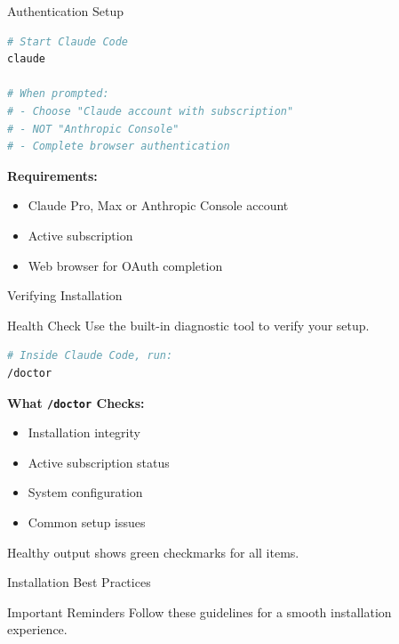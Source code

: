 \documentclass[9pt]{beamer}
\begin{document}
{\begin{frame}[fragile]{Authentication Setup}
\begin{lstlisting}[language=bash]
# Start Claude Code
claude

# When prompted:
# - Choose "Claude account with subscription"
# - NOT "Anthropic Console"
# - Complete browser authentication
\end{lstlisting}
		
		\textbf{Requirements:}
		\begin{itemize}
			\item Claude Pro, Max or Anthropic Console account
			\item Active subscription
			\item Web browser for OAuth completion
		\end{itemize}
	\end{frame}
	
	\begin{frame}[fragile]{Verifying Installation}
		\begin{block}{Health Check}
			Use the built-in diagnostic tool to verify your setup.
		\end{block}
		
\begin{lstlisting}[language=bash]
# Inside Claude Code, run:
/doctor
\end{lstlisting}

		\textbf{What \texttt{/doctor} Checks:}
		\begin{itemize}
			\item Installation integrity
			\item Active subscription status
			\item System configuration
			\item Common setup issues
		\end{itemize}
		
		\vspace{0.3cm}
		
		\alert{Healthy output shows green checkmarks for all items.}
	\end{frame}
	
	\begin{frame}{Installation Best Practices}
		\begin{alertblock}{Important Reminders}
			Follow these guidelines for a smooth installation experience.
		\end{alertblock}
		
		\vspace{0.5cm}
		

\end{frame}}
\end{document}
